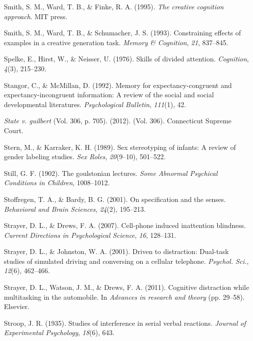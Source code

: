 \documentclass[
]{krantz}
\newlength{\cslhangindent}
\newenvironment{CSLReferences}[2] %
 {\begin{list}{}{%
  \setlength{\itemindent}{0pt}
  \setlength{\leftmargin}{0pt}
  \setlength{\parsep}{0pt}
  \ifodd #1
   \setlength{\leftmargin}{\cslhangindent}
   \setlength{\itemindent}{-1\cslhangindent}
  \fi
  \setlength{\itemsep}{#2\baselineskip}}}
 {\end{list}}
\begin{document}
\begin{CSLReferences}{1}{0}
Smith, S. M., Ward, T. B., \& Finke, R. A. (1995). \emph{The creative cognition approach}. MIT press.

Smith, S. M., Ward, T. B., \& Schumacher, J. S. (1993). Constraining effects of examples in a creative generation task. \emph{Memory \& Cognition}, \emph{21}, 837--845.

Spelke, E., Hirst, W., \& Neisser, U. (1976). Skills of divided attention. \emph{Cognition}, \emph{4}(3), 215--230.

Stangor, C., \& McMillan, D. (1992). Memory for expectancy-congruent and expectancy-incongruent information: A review of the social and social developmental literatures. \emph{Psychological Bulletin}, \emph{111}(1), 42.

\emph{State v. guilbert} (Vol. 306, p. 705). (2012). (Vol. 306). Connecticut Supreme Court.

Stern, M., \& Karraker, K. H. (1989). Sex stereotyping of infants: A review of gender labeling studies. \emph{Sex Roles}, \emph{20}(9--10), 501--522.

Still, G. F. (1902). The goulstonian lectures. \emph{Some Abnormal Psychical Conditions in Children}, 1008--1012.

Stoffregen, T. A., \& Bardy, B. G. (2001). On specification and the senses. \emph{Behavioral and Brain Sciences}, \emph{24}(2), 195--213.

Strayer, D. L., \& Drews, F. A. (2007). Cell-phone induced inattention blindness. \emph{Current Directions in Psychological Science}, \emph{16}, 128--131.

Strayer, D. L., \& Johnston, W. A. (2001). Driven to distraction: Dual-task studies of simulated driving and conversing on a cellular telephone. \emph{Psychol. Sci.}, \emph{12}(6), 462--466.

Strayer, D. L., Watson, J. M., \& Drews, F. A. (2011). Cognitive distraction while multitasking in the automobile. In \emph{Advances in research and theory} (pp. 29--58). Elsevier.

Stroop, J. R. (1935). Studies of interference in serial verbal reactions. \emph{Journal of Experimental Psychology}, \emph{18}(6), 643.


\end{CSLReferences}
\end{document}
